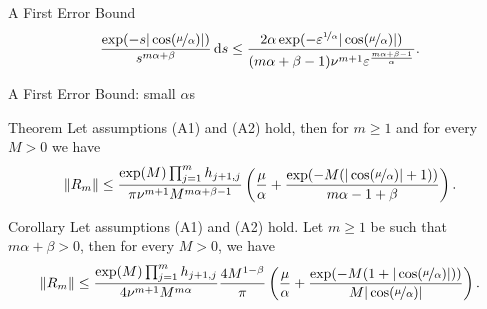 \documentclass[aspectratio=169,xcolor=dvipsnames]{beamer}
\begin{document}
\begin{frame}{A First Error Bound}
{{\[\begin{split}
	\frac{\exp(-s |\cos(\nicefrac{\mu}{\alpha})|)}{s^{m\alpha+\beta}}\,\mathrm{d}s \leq \frac{2 \alpha \exp(-\varepsilon^{\nicefrac{1}{\alpha}} |\cos(\nicefrac{\mu}{\alpha})| ) }{(m\alpha+\beta-1) \nu^{m+1} \varepsilon^{\frac{m\alpha+\beta-1}{\alpha}}}.
	\end{split}
	\]
}
}

\end{frame}

\begin{frame}{A First Error Bound: small $\alpha$s}

\begin{alertblock}{Theorem \parencite[Theorem~3.2]{MoretNovatiML}}
	Let assumptions (A1) and (A2) hold, then for $m \geq 1$ and for every $M > 0$ we have
	\[
	\|R_m\| \leq \frac{\exp(M) \prod_{j=1}^{m} h_{j+1,j} }{\pi \nu^{m+1} M^{m\alpha+\beta-1}} \left( \frac{\mu}{\alpha} + \frac{\exp(-M(|\cos(\nicefrac{\mu}{\alpha})| + 1))}{m\alpha-1+\beta} \right).
	\]
\end{alertblock}

\begin{alertblock}{Corollary \parencite[Corollary 3.3]{MoretNovatiML} }
Let assumptions (A1) and (A2) hold. Let $m \geq 1$ be such that $m \alpha + \beta > 0$, then for every $M>0$, we have
\[
\|R_m\| \leq \frac{\exp(M) \prod_{j=1}^{m} h_{j+1,j} }{4\nu^{m+1}M^{m\alpha}} \frac{4 M^{1-\beta}}{\pi} \left(\frac{\mu}{\alpha} + \frac{\exp(-M(1 + |\cos(\nicefrac{\mu}{\alpha})|))}{M |\cos(\nicefrac{\mu}{\alpha})| } \right).
\]
\end{alertblock}

\end{frame}
\end{document}
